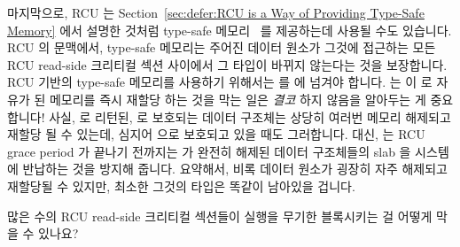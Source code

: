 마지막으로, RCU 는
Section~\ref{sec:defer:RCU is a Way of Providing Type-Safe Memory} 에서 설명한
것처럼 type-safe 메모리~\cite{Cheriton96a} 를 제공하는데 사용될 수도 있습니다.
RCU 의 문맥에서, type-safe 메모리는 주어진 데이터 원소가 그것에 접근하는 모든
RCU read-side 크리티컬 섹션 사이에서 그 타입이 바뀌지 않는다는 것을 보장합니다.
RCU 기반의 type-safe 메모리를 사용하기 위해서는  를
 에 넘겨야 합니다.
 는  이 
로 자유가 된 메모리를 즉시 재할당 하는 것을 막는 일은 \emph{결코} 하지 않음을
알아두는 게 중요합니다!
사실,  로 리턴된,  로 보호되는 데이터
구조체는 상당히 여러번 메모리 해제되고 재할당 될 수 있는데, 심지어
 으로 보호되고 있을 때도 그러합니다.
대신,  는 RCU grace period 가 끝나기 전까지는
 가 완전히 해제된 데이터 구조체들의 slab 을 시스템에
반납하는 것을 방지해 줍니다.
요약해서, 비록 데이터 원소가 굉장히 자주 해제되고 재할당될 수 있지만, 최소한
그것의 타입은 똑같이 남아있을 겁니다.

\QuickQuiz{}
	많은 수의 RCU read-side 크리티컬 섹션들이  실행을
	무기한 블록시키는 걸 어떻게 막을 수 있나요?
	\iffalse

